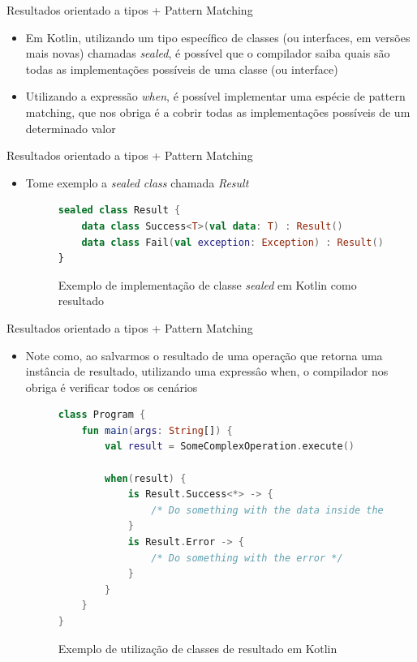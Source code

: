 \documentclass[brazilian]{beamer}
\begin{document}
\begin{frame}[fragile]{Resultados orientado a tipos + Pattern Matching}
    \begin{itemize}
        \item Em Kotlin, utilizando um tipo específico de classes (ou interfaces, em versões mais novas) chamadas \textit{sealed}, é possível que o compilador saiba quais são todas as implementações possíveis de uma classe (ou interface)
        \item Utilizando a expressão \emph{when}, é possível implementar uma espécie de pattern matching, que nos obriga é a cobrir todas as implementações possíveis de um determinado valor
    \end{itemize}
\end{frame}

\begin{frame}[fragile]{Resultados orientado a tipos + Pattern Matching}
    \begin{itemize}
        \item Tome exemplo a \emph{sealed class} chamada \textit{Result}
        \begin{figure}[H]
            \centering
            \begin{lstlisting}[language=Kotlin]
sealed class Result {
    data class Success<T>(val data: T) : Result()
    data class Fail(val exception: Exception) : Result()
}
            \end{lstlisting}
            \caption{Exemplo de implementação de classe \textit{sealed} em Kotlin como resultado}
            \label{fig:kotlin_result_sealed_type}
        \end{figure}
    \end{itemize}
\end{frame}

\begin{frame}[fragile]{Resultados orientado a tipos + Pattern Matching}
    \begin{itemize}
        \item Note como, ao salvarmos o resultado de uma operação que retorna uma instância de resultado, utilizando uma expressâo when, o compilador nos obriga é verificar todos os cenários
        \begin{figure}[H]
            \centering
            \begin{lstlisting}[language=Kotlin]
class Program {
    fun main(args: String[]) {
        val result = SomeComplexOperation.execute()

        when(result) {
            is Result.Success<*> -> {
                /* Do something with the data inside the success object */
            }
            is Result.Error -> {
                /* Do something with the error */
            }
        }
    }
}
            \end{lstlisting}
            \caption{Exemplo de utilização de classes de resultado em Kotlin}
            \label{fig:kotlin_result_class_example}
        \end{figure}
    \end{itemize}
\end{frame}
\end{document}

